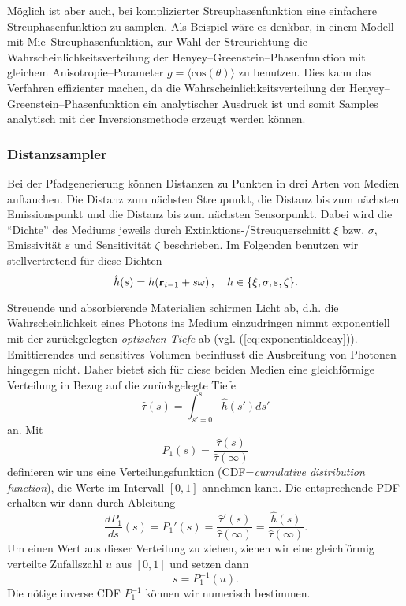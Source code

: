 	Möglich ist aber auch, bei komplizierter Streuphasenfunktion eine einfachere Streuphasenfunktion zu samplen. Als Beispiel wäre es denkbar, in einem Modell mit Mie--Streuphasenfunktion, zur Wahl der Streurichtung die Wahrscheinlichkeitsverteilung der Henyey--Greenstein--Phasenfunktion \citep[siehe][]{Henyey:1940p15273} mit gleichem Anisotropie--Parameter $g=\langle \text{cos}(\theta)\rangle$ zu benutzen. Dies kann das Verfahren effizienter machen, da die Wahrscheinlichkeitsverteilung der Henyey--Greenstein--Phasenfunktion ein analytischer Ausdruck ist und somit Samples analytisch mit der Inversionsmethode erzeugt werden können.
	
	\subsubsection{Distanzsampler}\label{subsubsec:distancesampler}
	Bei der Pfadgenerierung können Distanzen zu Punkten in drei Arten von Medien auftauchen. Die Distanz zum nächsten Streupunkt, die Distanz bis zum nächsten Emissionspunkt und die Distanz bis zum nächsten Sensorpunkt. Dabei wird die ``Dichte'' des Mediums jeweils durch Extinktions-/Streuquerschnitt $\xi$ bzw. $\sigma$, Emissivität $\varepsilon$ und Sensitivität $\zeta$ beschrieben. Im Folgenden benutzen wir stellvertretend für diese Dichten
	$${\hat h}(s)=h(\mathbf{r}_{i-1}+s\omega)\,,\quad h\in\{\xi,\sigma,\varepsilon,\zeta\}.$$
	
	Streuende und absorbierende Materialien schirmen Licht ab, d.h. die Wahrscheinlichkeit eines Photons ins Medium einzudringen nimmt exponentiell mit der zurückgelegten {\em optischen Tiefe} ab (vgl. (\ref{eq:exponentialdecay})). Emittierendes und sensitives Volumen beeinflusst die Ausbreitung von Photonen hingegen nicht. Daher bietet sich für diese beiden Medien eine gleichförmige Verteilung in Bezug auf die zurückgelegte Tiefe
	$${\hat \tau}(s)=\int_{s'=0}^s {\hat h}(s')ds'$$
	an. Mit
	$$P_1(s)=\frac{{\hat \tau}(s)}{{\hat \tau}(\infty)}$$
	definieren wir uns eine Verteilungsfunktion (CDF={\em cumulative distribution function}), die Werte im Intervall $[0,1]$ annehmen kann. Die entsprechende PDF erhalten wir dann durch Ableitung
	$$\frac{dP_1}{ds}(s)=P_1'(s)=\frac{{\hat \tau}'(s)}{{\hat \tau}(\infty)}=\frac{{\hat h}(s)}{{\hat \tau}(\infty)}.$$
	Um einen Wert aus dieser Verteilung zu ziehen, ziehen wir eine gleichförmig verteilte Zufallszahl $u$ aus $[0,1]$ und setzen dann
	$$s=P_1^{-1}(u).$$
	Die nötige inverse CDF $P_1^{-1}$ können wir numerisch bestimmen.
	

